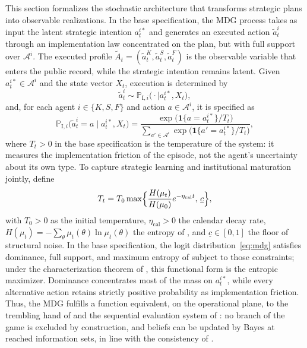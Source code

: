 \documentclass[review,authoryear,12pt]{elsarticle}
\theoremstyle{plain}
\theoremstyle{definition}
\newcommand{\1}{\mathbf{1}}
\newcommand{\ProbI}[1]{\mathbb{P}_{\mathrm{I},#1}}
\begin{document}
This section formalizes the stochastic architecture that transforms strategic plans into observable realizations. In the base specification, the MDG process takes as input the latent strategic intention $a_t^{i\ast}$ and generates an executed action $\tilde{a}_t^i$ through an implementation law concentrated on the plan, but with full support over $\mathcal{A}^i$. The executed profile $\tilde{A}_t=(\tilde{a}_t^K,\tilde{a}_t^S,\tilde{a}_t^F)$ is the observable variable that enters the public record, while the strategic intention remains latent. Given $a_t^{i\ast}\in\mathcal{A}^i$ and the state vector $X_t$, execution is determined by
\[
\tilde{a}_t^i\sim\ProbI{i}\bigl(\cdot\mid a_t^{i\ast},X_t\bigr),
\]
and, for each agent $i\in\{K,S,F\}$ and action $a\in\mathcal{A}^i$, it is specified as
\begin{equation}
\ProbI{i}\bigl(\tilde{a}_t^i=a\mid a_t^{i\ast},X_t\bigr)
=\frac{\exp\bigl(\mathbf{1}\{a=a_t^{i\ast}\}/T_t\bigr)}{\sum_{a'\in\mathcal{A}^i}\exp\bigl(\mathbf{1}\{a'=a_t^{i\ast}\}/T_t\bigr)},
\label{eq:mdg}
\end{equation}
where $T_t>0$ in the base specification is the temperature of the system: it measures the implementation friction of the episode, not the agent's uncertainty about its own type. To capture strategic learning and institutional maturation jointly, define
\begin{equation}
T_t=T_0\max\Bigl\{\frac{H(\mu_t)}{H(\mu_0)}e^{-\eta_{\mathrm{cal}}t},\,\underline{c}\Bigr\},
\label{eq:temperature}
\end{equation}
with $T_0>0$ as the initial temperature, $\eta_{\mathrm{cal}}>0$ the calendar decay rate, $H(\mu_t)=-\sum_\theta\mu_t(\theta)\ln\mu_t(\theta)$ the entropy of \citet{Shannon1948}, and $\underline{c}\in[0,1]$ the floor of structural noise. In the base specification, the logit distribution~\eqref{eq:mdg} satisfies dominance, full support, and maximum entropy of \citet{Shannon1948} subject to those constraints; under the characterization theorem of \citet{Jaynes1957Information}, this functional form is the entropic maximizer. Dominance concentrates most of the mass on $a_t^{i\ast}$, while every alternative action retains strictly positive probability as implementation friction. Thus, the MDG fulfills a function equivalent, on the operational plane, to the trembling hand of \citet{Selten1975Perfectness} and the sequential evaluation system of \citet{KrepsWilson1982}: no branch of the game is excluded by construction, and beliefs can be updated by Bayes at reached information sets, in line with the consistency of \citet{FudenbergTirole1991PBE}.
\end{document}
